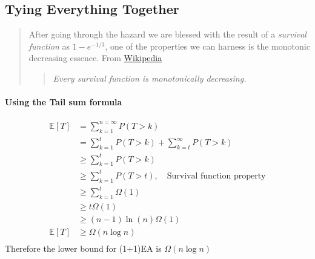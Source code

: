 \documentclass[a4paper, 12pt]{article}
\begin{document}
    \subsection{Tying Everything Together}
        \begin{quote}
            After going through the hazard we are blessed with the result of a \emph{survival function} as $1 - e^{-1/3}$, one of the properties we can harness
            is the monotonic decreasing essence. From \href{https://en.wikipedia.org/wiki/Survival_function}{Wikipedia}
            \begin{quote}
                \itshape Every survival function is monotonically decreasing. 
            \end{quote}
        \end{quote}
        \paragraph{Using the Tail sum formula}
        \begin{align*}
            \mathbb{E}[T] &= \sum_{k=1}^{n = \infty}P(T>k)\\
            &= \sum_{k=1}^{t}P(T>k) + \sum_{k=t}^{\infty}P(T>k)\\
            &\geq \sum_{k=1}^{t}P(T>k)\\
            &\geq \sum_{k=1}^{t}P(T>t),\quad\text{Survival function property}\\
            &\geq \sum_{k=1}^{t}\Omega(1)\\
            &\geq t\Omega(1)\\
            &\geq (n-1)\ln(n)\Omega(1)\\
            \mathbb{E}[T]&\geq \Omega(n\log n)\\
        \end{align*}
        Therefore the lower bound for (1+1)EA is $\Omega(n\log n)$
\end{document}
